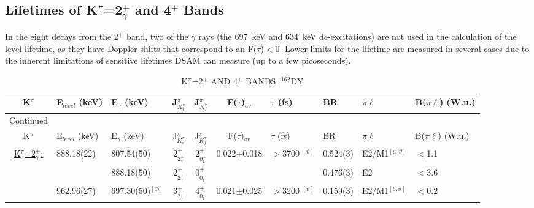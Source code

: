\subsection{Lifetimes of K$^\pi$=2$^+_\gamma$ and 4$^+$ Bands}

In the eight decays from the 2$^+$ band, two of the $\gamma$ rays (the 697~keV and 634~keV de-excitations) are not used in the calculation of the level lifetime, as they have Doppler shifts that correspond to an F($\tau$)$<$0. Lower limits for the lifetime are measured in several cases due to the inherent limitations of sensitive lifetimes DSAM can measure (up to a few picoseconds).


\begin{landscape}
\begin{center}
\begin{longtable}{cllcccllll}
\caption{K$^\pi$=2$^+$ AND 4$^+$ BANDS: $^{162}$DY \label{tab:162Dy_gamma_doublegamma}}\\ %
K$^\pi$                           & E$_{level}$ (keV) & E$_\gamma$ (keV)     & J$^\pi_{K^\pi_i}$  & J$^\pi_{K^\pi_f}$  &F($\tau$)$_{av}$ & $\tau$ (fs)                        & BR        & $\pi\ell$     & B($\pi\ell$) (W.u.) \\ \hline \hline \endfirsthead
\caption[]{K$^\pi$=2$^+$ AND 4$^+$ BANDS: $^{162}$DY}{Continued}\\ %
K$^\pi$                           & E$_{level}$ (keV) & E$_\gamma$ (keV)     & J$^\pi_{K^\pi_i}$  & J$^\pi_{K^\pi_f}$  &F($\tau$)$_{av}$ & $\tau$ (fs)                        & BR        & $\pi\ell$     & B($\pi\ell$) (W.u.) \\ \hline \hline \endhead
\underline{K$^\pi$=2$^+_\gamma$:} &  888.18(22) &  807.54(50)               & 2$^+_{2^+_\gamma}$ & 2$^+_{0^+_1}$ &0.022$\pm$0.018& $>$3700 $^{[\vartheta]}$                       & 0.524(3)            & E2/M1$^{[a,\vartheta]}$  & $<$1.1 \\
                                  &             &  888.18(50)               & 2$^+_{2^+_\gamma}$ & 0$^+_{0^+_1}$ &&                                                            & 0.476(3)            & E2                    & $<$3.6                            \\ 
                                  &  962.96(27) &  697.30(50)$^{[\oslash]}$ & 3$^+_{2^+_\gamma}$ & 4$^+_{0^+_1}$ &0.021$\pm$0.025& $>$3200 $^{[\vartheta]}$                       & 0.159(3)            & E2/M1$^{[b,\vartheta]}$  & $<$0.2    \\

\end{longtable}
\end{center}
\end{landscape}
